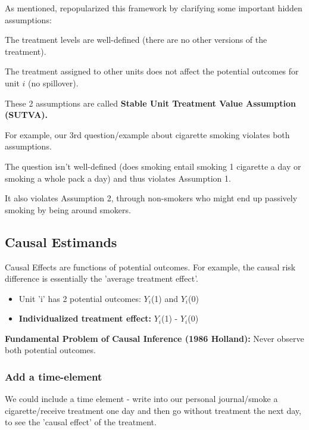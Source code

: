 As mentioned, \cite{rubin1980} repopularized this framework by clarifying some important hidden assumptions:

\begin{assumption}[Consistency]
The treatment levels are well-defined (there are no other versions of the treatment).
\end{assumption}

\begin{assumption}[No Interference]
The treatment assigned to other units does not affect the potential outcomes for unit $i$ (no spillover).
\end{assumption}

These 2 assumptions are called \textbf{Stable Unit Treatment Value Assumption (SUTVA).}

For example, our 3rd question/example about cigarette smoking violates both assumptions.

The question isn't well-defined (does smoking entail  smoking 1 cigarette a day or smoking a whole pack a day) and thus violates Assumption 1.

It also violates Assumption 2, through non-smokers who might end up passively smoking by being around smokers.

\subsection{Causal Estimands}
Causal Effects are functions of potential outcomes. For example, the causal risk difference is essentially the 'average treatment effect'.

\begin{itemize}
    \item Unit 'i' has 2 potential outcomes: $Y_i$(1) and $Y_i$(0)
\end{itemize}

\begin{itemize}
    \item \textbf{Individualized treatment effect:} $Y_i$(1) - $Y_i$(0)
\end{itemize}

\textbf{Fundamental Problem of Causal Inference (1986 Holland):}
Never observe both potential outcomes.

\subsubsection{Add a time-element}
We could include a time element - write into our personal journal/smoke a cigarette/receive treatment one day and then go without treatment the next day, to see the 'causal effect' of the treatment.


